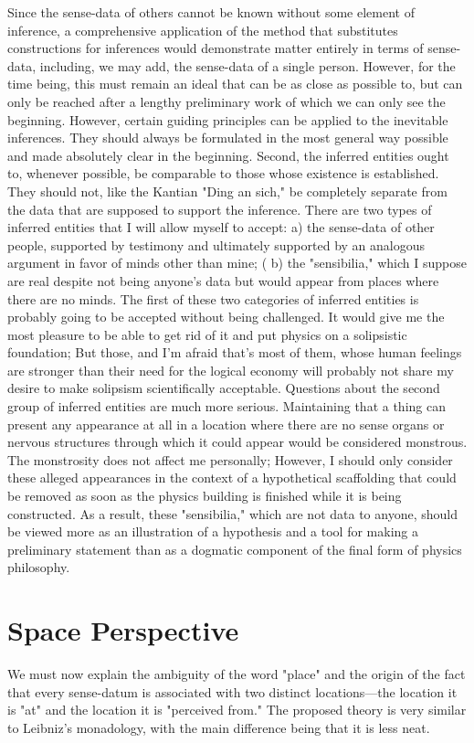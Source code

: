 \documentclass[a4paper,12pt]{book}[2004/02/16]
\theoremstyle{ilemma}
\theoremstyle{itheorem}
\theoremstyle{iother}
\theoremstyle{icorollary}
\theoremstyle{numcorollary}
\theoremstyle{idefinition}
\begin{document}
Since the sense-data of others cannot be known without some element of inference, a comprehensive application of the method that substitutes constructions for inferences would demonstrate matter entirely in terms of sense-data, including, we may add, the sense-data of a single person. However, for the time being, this must remain an ideal that can be as close as possible to, but can only be reached after a lengthy preliminary work of which we can only see the beginning. However, certain guiding principles can be applied to the inevitable inferences. They should always be formulated in the most general way possible and made absolutely clear in the beginning. Second, the inferred entities ought to, whenever possible, be comparable to those whose existence is established. They should not, like the Kantian "Ding an sich," be completely separate from the data that are supposed to support the inference. There are two types of inferred entities that I will allow myself to accept: a) the sense-data of other people, supported by testimony and ultimately supported by an analogous argument in favor of minds other than mine; ( b) the "sensibilia," which I suppose are real despite not being anyone's data but would appear from places where there are no minds. The first of these two categories of inferred entities is probably going to be accepted without being challenged. It would give me the most pleasure to be able to get rid of it and put physics on a solipsistic foundation; But those, and I'm afraid that's most of them, whose human feelings are stronger than their need for the logical economy will probably not share my desire to make solipsism scientifically acceptable. Questions about the second group of inferred entities are much more serious. Maintaining that a thing can present any appearance at all in a location where there are no sense organs or nervous structures through which it could appear would be considered monstrous. The monstrosity does not affect me personally; However, I should only consider these alleged appearances in the context of a hypothetical scaffolding that could be removed as soon as the physics building is finished while it is being constructed. As a result, these "sensibilia," which are not data to anyone, should be viewed more as an illustration of a hypothesis and a tool for making a preliminary statement than as a dogmatic component of the final form of physics philosophy.

\section{Space Perspective}
We must now explain the ambiguity of the word "place" and the origin of the fact that every sense-datum is associated with two distinct locations—the location it is "at" and the location it is "perceived from." The proposed theory is very similar to Leibniz's monadology, with the main difference being that it is less neat.
\end{document}
